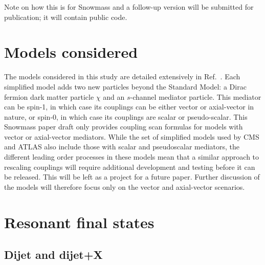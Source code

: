 \documentclass[a4paper, 11pt,notoc]{article}
\begin{document}
Note on how this is for Snowmass and a follow-up version will be submitted for publication; it will contain public code.

\section{Models considered}
\label{sec:models}

The models considered in this study are detailed extensively in Ref.~\cite{ABERCROMBIE2020100371}. Each simplified model adds two new particles beyond the Standard Model: a Dirac fermion dark matter particle $\chi$ and an $s$-channel mediator particle. This mediator can be spin-1, in which case its couplings can be either vector or axial-vector in nature, or spin-0, in which case its couplings are scalar or pseudo-scalar. This Snowmass paper draft only provides coupling scan formulas for models with vector or axial-vector mediators. While the set of simplified models used by CMS and ATLAS also include those with scalar and pseudoscalar mediators, the different leading order processes in these models mean that a similar approach to rescaling couplings will require additional development and testing before it can be released. This will be left as a project for a future paper. Further discussion of the models will therefore focus only on the vector and axial-vector scenarios.




\section{Resonant final states}
\label{sec:resonant}

\subsection{Dijet and dijet+X}

\end{document}
